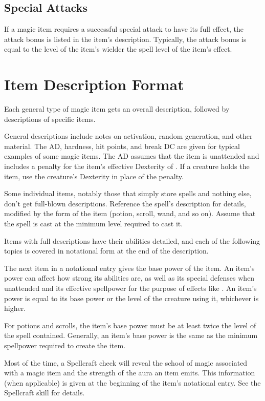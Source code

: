 \subsection{Special Attacks}

If a magic item requires a successful special attack to have its full effect, the attack bonus is listed in the item's description.
Typically, the attack bonus is equal to the level of the item's wielder \add the spell level of the item's effect.

\section{Item Description Format}

Each general type of magic item gets an overall description, followed by descriptions of specific items.

General descriptions include notes on activation, random generation, and other material.
The AD, hardness, hit points, and break DC are given for typical examples of some magic items.
The AD assumes that the item is unattended and includes a  penalty for the item's effective Dexterity of .
If a creature holds the item, use the creature's Dexterity in place of the  penalty.

Some individual items, notably those that simply store spells and nothing else, don't get full-blown descriptions.
Reference the spell's description for details, modified by the form of the item (potion, scroll, wand, and so on).
Assume that the spell is cast at the minimum level required to cast it.

Items with full descriptions have their abilities detailed, and each of the following topics is covered in notational form at the end of the description.

 The next item in a notational entry gives the base power of the item.
An item's power can affect how strong its abilities are, as well as its special defenses when unattended and its effective spellpower for the purpose of effects like .
An item's power is equal to its base power or the level of the creature using it, whichever is higher.

For potions and scrolls, the item's base power must be at least twice the level of the spell contained.
Generally, an item's base power is the same as the minimum spellpower required to create the item.

 Most of the time, a Spellcraft check will reveal the school of magic associated with a magic item and the strength of the aura an item emits.
This information (when applicable) is given at the beginning of the item's notational entry.
See the Spellcraft skill for details.


